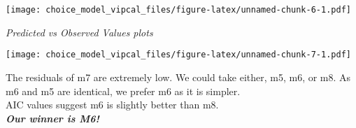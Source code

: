 \documentclass[
]{article}
\newenvironment{Shaded}{\begin{snugshade}}{\end{snugshade}}
\newcommand{\AttributeTok}[1]{\textcolor[rgb]{0.77,0.63,0.00}{#1}}
\newcommand{\ControlFlowTok}[1]{\textcolor[rgb]{0.13,0.29,0.53}{\textbf{#1}}}
\newcommand{\DecValTok}[1]{\textcolor[rgb]{0.00,0.00,0.81}{#1}}
\newcommand{\FunctionTok}[1]{\textcolor[rgb]{0.00,0.00,0.00}{#1}}
\newcommand{\NormalTok}[1]{#1}
\newcommand{\OtherTok}[1]{\textcolor[rgb]{0.56,0.35,0.01}{#1}}
\newcommand{\SpecialCharTok}[1]{\textcolor[rgb]{0.00,0.00,0.00}{#1}}
\newcommand{\StringTok}[1]{\textcolor[rgb]{0.31,0.60,0.02}{#1}}
\begin{document}
\texttt{[image: choice\_model\_vipcal\_files/figure-latex/unnamed-chunk-6-1.pdf]}

\emph{Predicted vs Observed Values plots}

\begin{Shaded}
\end{Shaded}

\texttt{[image: choice\_model\_vipcal\_files/figure-latex/unnamed-chunk-7-1.pdf]}

The residuals of m7 are extremely low. We could take either, m5, m6, or
m8. As m6 and m5 are identical, we prefer m6 as it is simpler.\\
AIC values suggest m6 is slightly better than m8.\\

\textbf{\emph{Our winner is M6!}}
\end{document}
